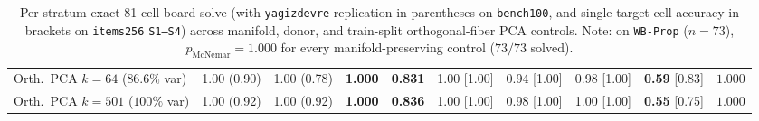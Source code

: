 \documentclass[10pt,letterpaper]{article}
\begin{document}
\begin{table}[t]
\begin{tabular}{@{}lccccccccc@{}}
Orth.\ PCA $k=64$ ($86.6\%$ var) & 1.00 (0.90) & 1.00 (0.78) & \textbf{1.000} & \textbf{0.831} & 1.00 [1.00] & 0.94 [1.00] & 0.98 [1.00] & \textbf{0.59} [0.83] & $1.000$ \\
Orth.\ PCA $k=501$ ($100\%$ var) & 1.00 (0.92) & 1.00 (0.92) & \textbf{1.000} & \textbf{0.836} & 1.00 [1.00] & 0.98 [1.00] & 1.00 [1.00] & \textbf{0.55} [0.75] & $1.000$ \\
\bottomrule
\end{tabular}
\caption{Per-stratum exact 81-cell board solve (with \texttt{yagizdevre} replication in parentheses on \texttt{bench100}, and single target-cell accuracy in brackets on \texttt{items256} \texttt{S1--S4}) across manifold, donor, and train-split orthogonal-fiber PCA controls. Note: on \texttt{WB-Prop} ($n=73$), $p_{\mathrm{McNemar}} = 1.000$ for every manifold-preserving control ($73/73$ solved).}
\label{tab:fiber_controls}
\end{table}
\end{document}

